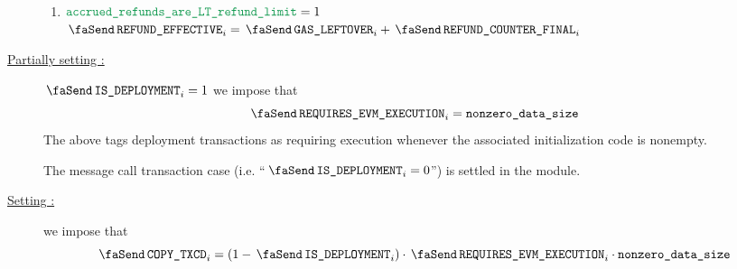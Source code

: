 \begin{description}
\begin{enumerate}
                        \item \If $\locAccruedRefundsAreLtRefundLimit = 1$ \Then $\txEffectiveRefund _{i} = \txLeftoverGas _{i} + \txFinalRefundCounter _{i}$
                \end{enumerate}
        \item[\underline{Partially setting \txRequiresEvmExecution{}:}]
                \If $\txIsDeployment_{i} = 1$ \Then we impose that
                \[
                        \txRequiresEvmExecution_{i} = \locNonzeroDataSize
                \]
                \saNote{} The above tags deployment transactions as requiring \evm{} execution whenever the associated initialization code is nonempty.

                \saNote{} The message call transaction case (i.e. ``$\txIsDeployment_{i} = 0$'') is settled in the \hubMod{} module.
        \item[\underline{Setting \txCopyTxcd{}:}]
                we impose that
                \[
                        \txCopyTxcd_{i} = (1 - \txIsDeployment_{i}) \cdot \txRequiresEvmExecution_{i} \cdot \locNonzeroDataSize
                \]
\end{description}


